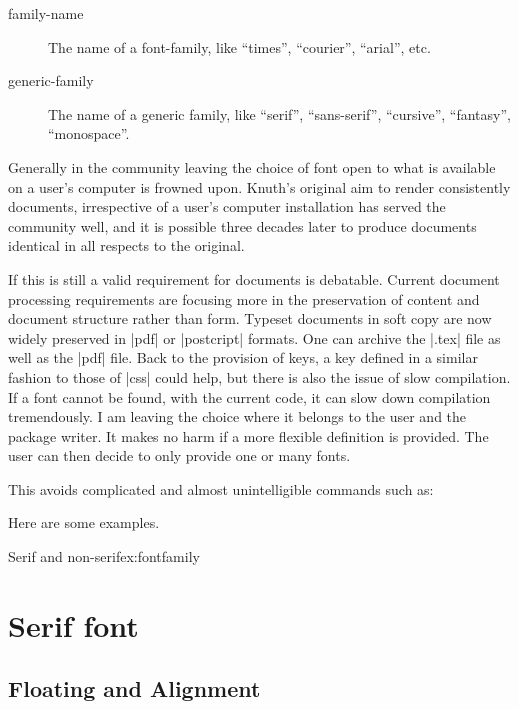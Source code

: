\begin{description}
\item[family-name] The name of a font-family, like “times”, “courier”, “arial”, etc.
\item[generic-family] The name of a generic family, like “serif”, “sans-serif”, “cursive”, “fantasy”, “monospace”.
\end{description}

Generally in the \tex community leaving the choice of font  open to what is available on a user’s computer is frowned upon. Knuth’s original aim to render consistently documents, irrespective of a user’s computer installation has served the community well, and it is possible three decades later to produce documents identical in all respects to the original. 

If this is still a valid requirement for documents is debatable. Current document processing requirements are focusing more in the preservation of content and document structure rather than form. Typeset documents in soft copy are now widely preserved in |pdf| or |postcript|  formats. One can archive the |.tex| file as well as the |pdf| file.  Back to the provision of keys, a key defined in a 
similar fashion to those of |css| could help, but there is also the issue of slow compilation. If a font cannot be
found, with the current code, it can slow down compilation tremendously. I am leaving the choice where it belongs to the user and the package writer. It makes no harm if a more flexible definition is provided. The user can then decide to only provide one or many fonts. 

This avoids complicated and almost unintelligible commands such as:

\begin{dispListing}
\end{dispListing}

Here are some examples. 

\begin{texexample}{Serif and non-serif}{ex:fontfamily}
\chapter{Serif font}
\lorem
\end{texexample}


\section{Floating and Alignment} 


